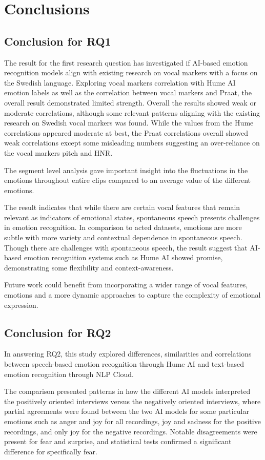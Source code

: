 \section{Conclusions}
\subsection{Conclusion for RQ1}
The result for the first research question has investigated if AI-based emotion recognition models align with existing research on vocal markers with a focus on the Swedish language.
Exploring vocal markers correlation with Hume AI emotion labels as well as the correlation between vocal markers and Praat, the overall result demonstrated limited strength.
Overall the results showed weak or moderate correlations, although some relevant patterns aligning with the existing research on Swedish vocal markers \autocite{Ekberg2023} was found.
While the values from the Hume correlations appeared moderate at best, the Praat correlations overall showed weak correlations except some misleading numbers suggesting an over-reliance on the vocal markers pitch and HNR.

The segment level analysis gave important insight into the fluctuations in the emotions throughout entire clips compared to an average value of the different emotions.

The result indicates that while there are certain vocal features that remain relevant as indicators of emotional states, spontaneous speech presents challenges in emotion recognition. In comparison to acted datasets, emotions are more subtle with more variety and contextual dependence in spontaneous speech.
Though there are challenges with spontaneous speech, the result suggest that AI-based emotion recognition systems such as Hume AI showed promise, demonstrating some flexibility and context-awareness.

Future work could benefit from incorporating a wider range of vocal features, emotions and a more dynamic approaches to capture the complexity of emotional expression.

\subsection{Conclusion for RQ2}
In answering RQ2, this study explored differences, similarities and correlations between speech-based emotion recognition through Hume AI and text-based emotion recognition through NLP Cloud.

The comparison presented patterns in how the different AI models interpreted the positively oriented interviews versus the negatively oriented interviews, where partial agreements were found between the two AI models for some particular emotions such as anger and joy for all recordings, joy and sadness for the positive recordings, and only joy for the negative recordings. Notable disagreements were present for fear and surprise, and statistical tests confirmed a significant difference for specifically fear.

